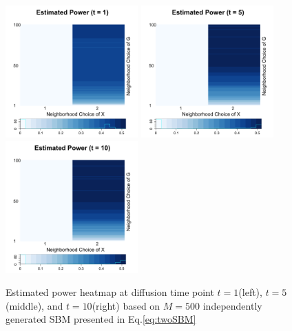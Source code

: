 \documentclass[12pt]{article}
\theoremstyle{definition}
\begin{document}
\begin{figure}[H]
	\centering
	\includegraphics[width=2in]{../Figure/twoSBM_power1.png}
	\includegraphics[width=2in]{../Figure/twoSBM_power5.png}
	\includegraphics[width=2in]{../Figure/twoSBM_power10.png}
	\caption{Estimated power heatmap at diffusion time point $t=1$(left), $t=5$(middle), and $t=10$(right) based on $M = 500$ independently generated SBM presented in Eq.\ref{eq:twoSBM}}
	\label{fig:twoSBM_power}
\end{figure}
\end{document}
